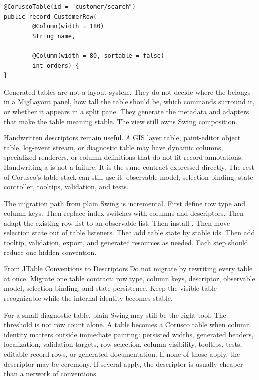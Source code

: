 \begin{lstlisting}[caption={Annotated table row source.}]
@CoruscoTable(id = "customer/search")
public record CustomerRow(
        @Column(width = 180)
        String name,

        @Column(width = 80, sortable = false)
        int orders) {
}
\end{lstlisting}

Generated tables are not a layout system. They do not decide where the
 belongs in a MigLayout panel, how tall the table should be, which
commands surround it, or whether it appears in a split pane. They generate the
metadata and adapters that make the table meaning stable. The view still owns
Swing composition.

Handwritten descriptors remain useful. A GIS layer table, paint-editor object
table, log-event stream, or diagnostic table may have dynamic columns,
specialized renderers, or column definitions that do not fit record
annotations. Handwriting a  is not a failure. It is the
same contract expressed directly. The rest of Corusco's table stack can still
use it: observable model, selection binding, state controller, tooltips,
validation, and tests.

The migration path from plain Swing is incremental. First define row type and
column keys. Then replace index switches with columns and descriptors. Then
adapt the existing row list to an observable list. Then install
. Then move selection state out of table listeners.
Then add table state by stable ids. Then add tooltip, validation, export, and
generated resources as needed. Each step should reduce one hidden convention.

\begin{migrationbox}{From JTable Conventions to Descriptors}
Do not migrate by rewriting every table at once. Migrate one table contract:
row type, column keys, descriptor, observable model, selection binding, and
state persistence. Keep the visible table recognizable while the internal
identity becomes stable.
\end{migrationbox}

For a small diagnostic table, plain Swing may still be the right tool. The
threshold is not row count alone. A table becomes a Corusco table when column
identity matters outside immediate painting: persisted widths, generated
headers, localization, validation targets, row selection, column visibility,
tooltips, tests, editable record rows, or generated documentation. If none of
those apply, the descriptor may be ceremony. If several apply, the descriptor
is usually cheaper than a network of conventions.

